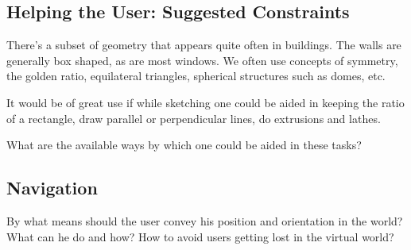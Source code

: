 \subsection{Helping the User: Suggested Constraints}
There's a subset of geometry that appears quite often in buildings.
The walls are generally box shaped, as are most windows. We often use concepts of symmetry,
the golden ratio, equilateral triangles, spherical structures such as domes, etc.

It would be of great use if while sketching one could be aided in keeping the ratio of
a rectangle, draw parallel or perpendicular lines, do extrusions and lathes.

What are the available ways by which one could be aided in these tasks?


\subsection{Navigation}
By what means should the user convey his position and orientation in the world?
What can he do and how? How to avoid users getting lost in the virtual world?


